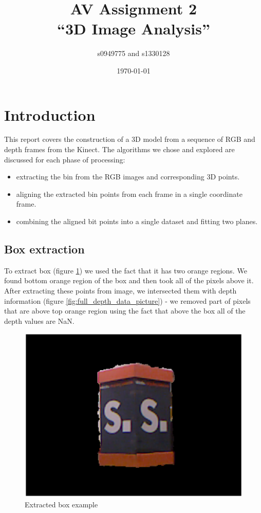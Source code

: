 \documentclass{article}
\begin{document}
\title{AV Assignment 2\\``3D Image Analysis''}
\author{s0949775 and s1330128}
\date{\today}
\maketitle


\section{Introduction}
This report covers the construction of a 3D model from a 
sequence of RGB and depth frames from the Kinect. 
The algorithms we chose and explored are discussed for
each phase of processing:
\begin{itemize}
\item extracting the bin from the RGB images and corresponding 3D points.
\item aligning the extracted bin points from each frame in a single coordinate frame.
\item combining the aligned bit points into a single dataset and fitting two planes.
\end{itemize}

\subsection{Box extraction}
To extract box (figure \ref{fig:extracted_box_example}) we used the fact that it has two orange regions.
We found bottom orange region of the box and then took all of the
pixels above it. After extracting these points from image, we 
intersected them with depth information (figure \ref{fig:full_depth_data_picture}) - we removed part of
pixels that are above top orange region using the fact that above
the box all of the depth values are NaN.

\begin{figure}[h!]
  \centering
  \includegraphics[width=1.0\textwidth]{figs/extracted_box_example}
  \caption{Extracted box example}
  \label{fig:extracted_box_example}
\end{figure}
\end{document}
